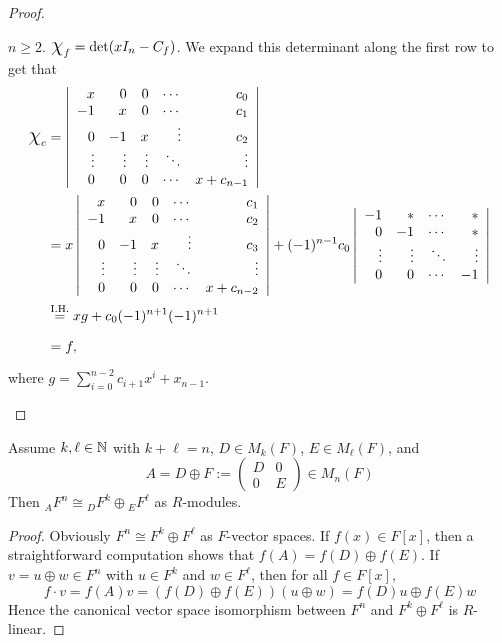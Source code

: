 \documentclass[11pt]{book}
\theoremstyle{definition}   \newtheorem{defn}[counter]{Definition} %
\newcommand{\mymatrix}[2]{\left( \begin{array}{#1} #2 \end{array} \right)}
\newcommand{\mydet}[2]{\left| \begin{array}{#1} #2 \end{array} \right|} \newcommand{\myvec}[1]{\left( \begin{array}{c} #1 \end{array} \right)}
\newcommand{\Chi}{\mbox{\Large $\chi$}}
\newcommand{\vs}{\vspace{8pt}}
\numberwithin{counter}{chapter}
\begin{document}
\begin{proof}
\begin{enumerate}
$n \geq 2$. $\Chi_f = \det (xI_n - C_f)$. We expand this determinant along the first row to get that
\begin{align*}
\Chi_c &= \mydet{rrrrr}{x & 0 & 0 & \cdots & c_0 \\
                       -1 & x & 0 & \cdots & c_1 \\
                       0 & -1 & x & \vdots  & c_2\\
                       \vdots & \vdots & \vdots & \ddots & \vdots \\
                       0 & 0 & 0 & \cdots & x + c_{n-1}} \\
                       &= x \mydet{rrrrr}{x & 0 & 0 & \cdots & c_1 \\
                                              -1 & x & 0 & \cdots & c_2 \\
                                              0 & -1 & x & \vdots  & c_3\\
                                              \vdots & \vdots & \vdots & \ddots & \vdots \\
                                              0 & 0 & 0 & \cdots & x + c_{n-2}} + (-1)^{n-1} c_0 \mydet{rrrr}{-1 & \ast & \cdots & \ast \\
                                                           0 & -1 & \cdots & \ast \\
                                                           \vdots & \vdots & \ddots & \vdots \\
                                                           0 & 0 & \cdots & -1} \\
        &\overset{\tn{I.H.}}{=} x g + c_0 (-1)^{n+1} (-1)^{n+1} \\
        &= f,
\end{align*}
where $g = \sum_{i=0}^{n-2} c_{i+1} x^i + x_{n-1}$.
\end{enumerate}
\end{proof}

\vs

\begin{lemma}
Assume $k,\ell \in \operatorname{\mathbb{N}}$ with $k + \ell = n$, $D \in M_k(F)$, $E \in M_\ell(F)$, and
	\[A = D \oplus F := \mymatrix{cc}{D & 0 \\ 0 & E} \in M_n(F) \]
Then ${_AF^n} \cong {_DF^k} \oplus {_EF^\ell}$ as $R$-modules.
\end{lemma}

\begin{proof}
Obviously $F^n \cong F^k \oplus F^\ell$ as $F$-vector spaces. If $f(x) \in F[x]$, then a straightforward computation shows that $f(A) = f(D) \oplus f(E)$. If $v = u \oplus w \in F^n$ with $u \in F^k$ and $w \in F^\ell$, then for all $f \in F[x]$,
	\[f \cdot v = f(A) v = (f(D) \oplus f(E)) (u \oplus w) = f(D)u \oplus f(E)w \]
Hence the canonical vector space isomorphism between $F^n$ and $F^k \oplus F^\ell$ is $R$-linear.
\end{proof}
\end{document}
